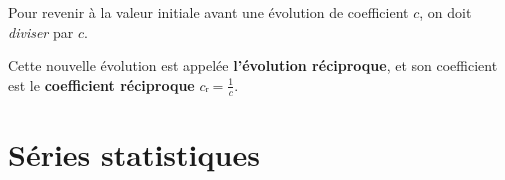 \documentclass[
	classe=$2^{de}$
]{coursclass}
\begin{document}
\begin{propriete}
	Pour revenir à la valeur initiale avant une évolution de coefficient $c$, on doit \textit{diviser} par $c$.

	Cette nouvelle évolution est appelée \textbf{l'évolution réciproque}, et son coefficient est le \textbf{coefficient réciproque} $cᵣ = \frac{1}{c}$.
\end{propriete}

\section{Séries statistiques}
\end{document}
